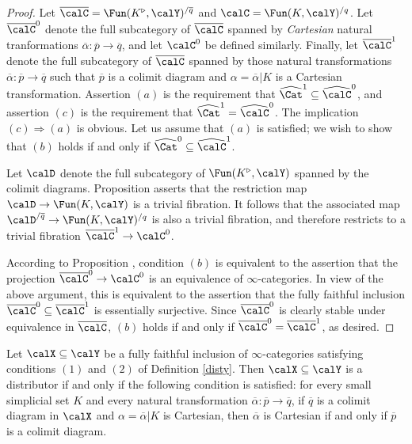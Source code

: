 \begin{proof}
Let $\overline{\calC} = \Fun(K^{\triangleright}, \calY)^{/\overline{q}}$ and
$\calC = \Fun(K,\calY)^{/q}$. Let $\overline{\calC}^{0}$ denote the full subcategory of
$\overline{\calC}$ spanned by {\em Cartesian} natural tranformations $\overline{\alpha}: \overline{p} \rightarrow \overline{q}$, and let $\calC^0$ be defined similarly. Finally, let
$\overline{\calC}^{1}$ denote the full subcategory of $\overline{\calC}$ spanned by those natural transformations $\overline{\alpha}: \overline{p} \rightarrow \overline{q}$ such that $\overline{p}$ is a colimit diagram and $\alpha = \overline{\alpha} | K$ is a Cartesian transformation. 
Assertion $(a)$ is the requirement that $\widehat{\Cat}^{1} \subseteq \widehat{\calC}^0$, and
assertion $(c)$ is the requirement that $\widehat{\Cat}^{1} = \widehat{\calC}^0$. The implication
$(c) \Rightarrow (a)$ is obvious. Let us assume that $(a)$ is satisfied; we wish to show that
$(b)$ holds if and only if $\widehat{\Cat}^0 \subseteq \widehat{\calC}^1$.

Let $\calD$ denote the full subcategory of $\Fun(K^{\triangleright}, \calY)$ spanned by the colimit diagrams. Proposition  asserts that the restriction map $\calD \rightarrow \Fun(K,\calY)$ is a trivial fibration. It follows that the associated map $\calD^{/\overline{q}} \rightarrow \Fun(K,\calY)^{/q}$ is also a trivial fibration, and therefore restricts to a trivial fibration $\overline{\calC}^{1} \rightarrow \calC^{0}$.

According to Proposition , condition $(b)$ is equivalent to the assertion that
the projection $\overline{\calC}^{0} \rightarrow \calC^0$ is an equivalence of $\infty$-categories.
In view of the above argument, this is equivalent to the assertion that the fully faithful inclusion
$\overline{\calC}^{0} \subseteq \overline{\calC}^{1}$ is essentially surjective. Since
$\overline{\calC}^{0}$ is clearly stable under equivalence in $\overline{\calC}$, $(b)$
holds if and only if $\overline{\calC}^0 = \overline{\calC}^1$, as desired.
\end{proof}

\begin{corollary}\label{summa}
Let $\calX \subseteq \calY$ be a fully faithful inclusion of $\infty$-categories satisfying conditions
$(1)$ and $(2)$ of Definition \ref{disty}. Then $\calX \subseteq \calY$ is a distributor if and only if the following condition is satisfied: for every small simplicial set $K$ and every natural
transformation $\overline{\alpha}: \overline{p} \rightarrow \overline{q}$, if
$\overline{q}$ is a colimit diagram in $\calX$ and $\alpha = \overline{\alpha} | K$ is
Cartesian, then $\overline{\alpha}$ is Cartesian if and only if $\overline{p}$ is a colimit diagram.
\end{corollary}


